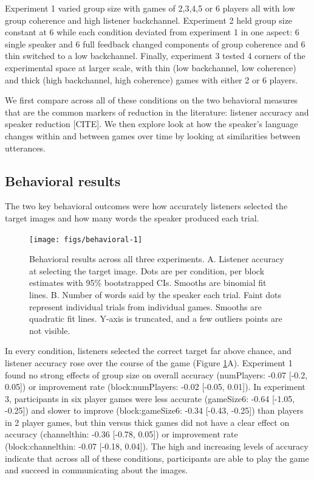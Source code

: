 \documentclass[
  english,
  a4paper,
]{article}
\begin{document}
Experiment 1 varied group size with games of 2,3,4,5 or 6 players all with low group coherence and high listener backchannel. Experiment 2 held group size constant at 6 while each condition deviated from experiment 1 in one aspect: 6 single speaker and 6 full feedback changed components of group coherence and 6 thin switched to a low backchannel. Finally, experiment 3 tested 4 corners of the experimental space at larger scale, with thin (low backchannel, low coherence) and thick (high backchannel, high coherence) games with either 2 or 6 players.

We first compare across all of these conditions on the two behavioral measures that are the common markers of reduction in the literature: listener accuracy and speaker reduction {[}CITE{]}. We then explore look at how the speaker's language changes within and between games over time by looking at similarities between utterances.

\hypertarget{behavioral-results}{%
\subsection{Behavioral results}\label{behavioral-results}}

The two key behavioral outcomes were how accurately listeners selected the target images and how many words the speaker produced each trial.

\begin{figure}[t!]

{\centering \texttt{[image: figs/behavioral-1]} 

}

\caption{Behavioral results across all three experiments. A. Listener accuracy at selecting the target image. Dots are per condition, per block estimates with 95\% bootstrapped CIs. Smooths are binomial fit lines. B. Number of words said by the speaker each trial. Faint dots represent individual trials from individual games. Smooths are quadratic fit lines. Y-axis is truncated, and a few outliers points are not visible. }\label{fig:behavioral}
\end{figure}

In every condition, listeners selected the correct target far above chance, and listener accuracy rose over the course of the game (Figure \ref{fig:behavioral}A). Experiment 1 found no strong effects of group size on overall accuracy (numPlayers: -0.07 {[}-0.2, 0.05{]}) or improvement rate (block:numPlayers: -0.02 {[}-0.05, 0.01{]}). In experiment 3, participants in six player games were less accurate (gameSize6: -0.64 {[}-1.05, -0.25{]}) and slower to improve (block:gameSize6: -0.34 {[}-0.43, -0.25{]}) than players in 2 player games, but thin versus thick games did not have a clear effect on accuracy (channelthin: -0.36 {[}-0.78, 0.05{]}) or improvement rate (block:channelthin: -0.07 {[}-0.18, 0.04{]}). The high and increasing levels of accuracy indicate that across all of these conditions, participants are able to play the game and succeed in communicating about the images.
\end{document}
